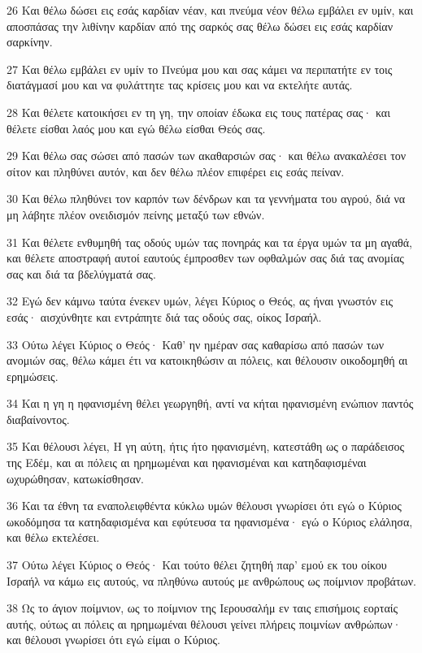 \par 26 Και θέλω δώσει εις εσάς καρδίαν νέαν, και πνεύμα νέον θέλω εμβάλει εν υμίν, και αποσπάσας την λιθίνην καρδίαν από της σαρκός σας θέλω δώσει εις εσάς καρδίαν σαρκίνην.
\par 27 Και θέλω εμβάλει εν υμίν το Πνεύμα μου και σας κάμει να περιπατήτε εν τοις διατάγμασί μου και να φυλάττητε τας κρίσεις μου και να εκτελήτε αυτάς.
\par 28 Και θέλετε κατοικήσει εν τη γη, την οποίαν έδωκα εις τους πατέρας σας· και θέλετε είσθαι λαός μου και εγώ θέλω είσθαι Θεός σας.
\par 29 Και θέλω σας σώσει από πασών των ακαθαρσιών σας· και θέλω ανακαλέσει τον σίτον και πληθύνει αυτόν, και δεν θέλω πλέον επιφέρει εις εσάς πείναν.
\par 30 Και θέλω πληθύνει τον καρπόν των δένδρων και τα γεννήματα του αγρού, διά να μη λάβητε πλέον ονειδισμόν πείνης μεταξύ των εθνών.
\par 31 Και θέλετε ενθυμηθή τας οδούς υμών τας πονηράς και τα έργα υμών τα μη αγαθά, και θέλετε αποστραφή αυτοί εαυτούς έμπροσθεν των οφθαλμών σας διά τας ανομίας σας και διά τα βδελύγματά σας.
\par 32 Εγώ δεν κάμνω ταύτα ένεκεν υμών, λέγει Κύριος ο Θεός, ας ήναι γνωστόν εις εσάς· αισχύνθητε και εντράπητε διά τας οδούς σας, οίκος Ισραήλ.
\par 33 Ούτω λέγει Κύριος ο Θεός· Καθ' ην ημέραν σας καθαρίσω από πασών των ανομιών σας, θέλω κάμει έτι να κατοικηθώσιν αι πόλεις, και θέλουσιν οικοδομηθή αι ερημώσεις.
\par 34 Και η γη η ηφανισμένη θέλει γεωργηθή, αντί να κήται ηφανισμένη ενώπιον παντός διαβαίνοντος.
\par 35 Και θέλουσι λέγει, Η γη αύτη, ήτις ήτο ηφανισμένη, κατεστάθη ως ο παράδεισος της Εδέμ, και αι πόλεις αι ηρημωμέναι και ηφανισμέναι και κατηδαφισμέναι ωχυρώθησαν, κατωκίσθησαν.
\par 36 Και τα έθνη τα εναπολειφθέντα κύκλω υμών θέλουσι γνωρίσει ότι εγώ ο Κύριος ωκοδόμησα τα κατηδαφισμένα και εφύτευσα τα ηφανισμένα· εγώ ο Κύριος ελάλησα, και θέλω εκτελέσει.
\par 37 Ούτω λέγει Κύριος ο Θεός· Και τούτο θέλει ζητηθή παρ' εμού εκ του οίκου Ισραήλ να κάμω εις αυτούς, να πληθύνω αυτούς με ανθρώπους ως ποίμνιον προβάτων.
\par 38 Ως το άγιον ποίμνιον, ως το ποίμνιον της Ιερουσαλήμ εν ταις επισήμοις εορταίς αυτής, ούτως αι πόλεις αι ηρημωμέναι θέλουσι γείνει πλήρεις ποιμνίων ανθρώπων· και θέλουσι γνωρίσει ότι εγώ είμαι ο Κύριος.

